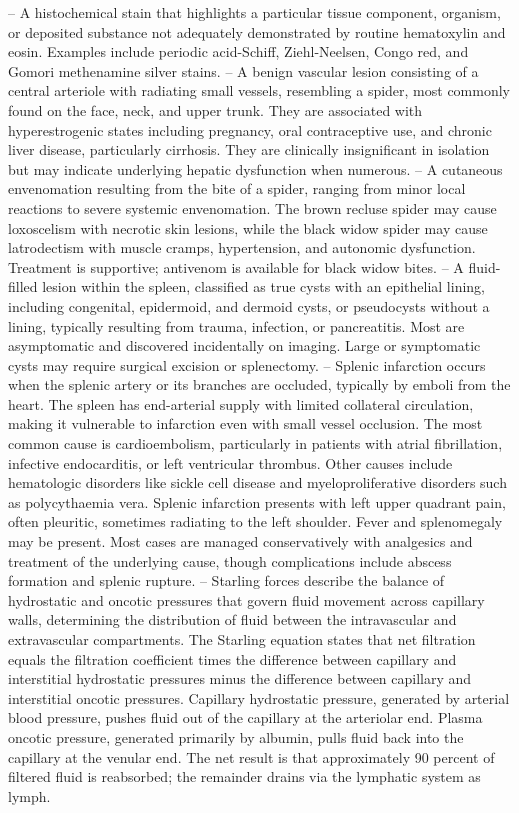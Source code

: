 -- A histochemical stain that highlights a particular tissue component, organism, or deposited substance not adequately demonstrated by routine hematoxylin and eosin. Examples include periodic acid-Schiff, Ziehl-Neelsen, Congo red, and Gomori methenamine silver stains.
-- A benign vascular lesion consisting of a central arteriole with radiating small vessels, resembling a spider, most commonly found on the face, neck, and upper trunk. They are associated with hyperestrogenic states including pregnancy, oral contraceptive use, and chronic liver disease, particularly cirrhosis. They are clinically insignificant in isolation but may indicate underlying hepatic dysfunction when numerous.
-- A cutaneous envenomation resulting from the bite of a spider, ranging from minor local reactions to severe systemic envenomation. The brown recluse spider may cause loxoscelism with necrotic skin lesions, while the black widow spider may cause latrodectism with muscle cramps, hypertension, and autonomic dysfunction. Treatment is supportive; antivenom is available for black widow bites.
-- A fluid-filled lesion within the spleen, classified as true cysts with an epithelial lining, including congenital, epidermoid, and dermoid cysts, or pseudocysts without a lining, typically resulting from trauma, infection, or pancreatitis. Most are asymptomatic and discovered incidentally on imaging. Large or symptomatic cysts may require surgical excision or splenectomy.
-- Splenic infarction occurs when the splenic artery or its branches are occluded, typically by emboli from the heart. The spleen has end-arterial supply with limited collateral circulation, making it vulnerable to infarction even with small vessel occlusion. The most common cause is cardioembolism, particularly in patients with atrial fibrillation, infective endocarditis, or left ventricular thrombus. Other causes include hematologic disorders like sickle cell disease and myeloproliferative disorders such as polycythaemia vera. Splenic infarction presents with left upper quadrant pain, often pleuritic, sometimes radiating to the left shoulder. Fever and splenomegaly may be present. Most cases are managed conservatively with analgesics and treatment of the underlying cause, though complications include abscess formation and splenic rupture.
-- Starling forces describe the balance of hydrostatic and oncotic pressures that govern fluid movement across capillary walls, determining the distribution of fluid between the intravascular and extravascular compartments. The Starling equation states that net filtration equals the filtration coefficient times the difference between capillary and interstitial hydrostatic pressures minus the difference between capillary and interstitial oncotic pressures. Capillary hydrostatic pressure, generated by arterial blood pressure, pushes fluid out of the capillary at the arteriolar end. Plasma oncotic pressure, generated primarily by albumin, pulls fluid back into the capillary at the venular end. The net result is that approximately 90 percent of filtered fluid is reabsorbed; the remainder drains via the lymphatic system as lymph.
